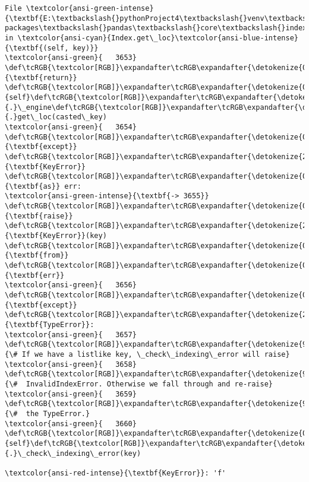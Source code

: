 \documentclass[11pt]{ctexart}
\begin{document}
\begin{Verbatim}[commandchars=\\\{\}, frame=single, framerule=2mm, rulecolor=\color{outerrorbackground}]
File \textcolor{ansi-green-intense}{\textbf{E:\textbackslash{}pythonProject4\textbackslash{}venv\textbackslash{}lib\textbackslash{}site-packages\textbackslash{}pandas\textbackslash{}core\textbackslash{}indexes\textbackslash{}base.py:3655}}, in \textcolor{ansi-cyan}{Index.get\_loc}\textcolor{ansi-blue-intense}{\textbf{(self, key)}}
\textcolor{ansi-green}{   3653}     \def\tcRGB{\textcolor[RGB]}\expandafter\tcRGB\expandafter{\detokenize{0,135,0}}{\textbf{return}} \def\tcRGB{\textcolor[RGB]}\expandafter\tcRGB\expandafter{\detokenize{0,135,0}}{self}\def\tcRGB{\textcolor[RGB]}\expandafter\tcRGB\expandafter{\detokenize{98,98,98}}{.}\_engine\def\tcRGB{\textcolor[RGB]}\expandafter\tcRGB\expandafter{\detokenize{98,98,98}}{.}get\_loc(casted\_key)
\textcolor{ansi-green}{   3654} \def\tcRGB{\textcolor[RGB]}\expandafter\tcRGB\expandafter{\detokenize{0,135,0}}{\textbf{except}} \def\tcRGB{\textcolor[RGB]}\expandafter\tcRGB\expandafter{\detokenize{215,95,95}}{\textbf{KeyError}} \def\tcRGB{\textcolor[RGB]}\expandafter\tcRGB\expandafter{\detokenize{0,135,0}}{\textbf{as}} err:
\textcolor{ansi-green-intense}{\textbf{-> 3655}}     \def\tcRGB{\textcolor[RGB]}\expandafter\tcRGB\expandafter{\detokenize{0,135,0}}{\textbf{raise}} \def\tcRGB{\textcolor[RGB]}\expandafter\tcRGB\expandafter{\detokenize{215,95,95}}{\textbf{KeyError}}(key) \def\tcRGB{\textcolor[RGB]}\expandafter\tcRGB\expandafter{\detokenize{0,135,0}}{\textbf{from}} \def\tcRGB{\textcolor[RGB]}\expandafter\tcRGB\expandafter{\detokenize{0,0,255}}{\textbf{err}}
\textcolor{ansi-green}{   3656} \def\tcRGB{\textcolor[RGB]}\expandafter\tcRGB\expandafter{\detokenize{0,135,0}}{\textbf{except}} \def\tcRGB{\textcolor[RGB]}\expandafter\tcRGB\expandafter{\detokenize{215,95,95}}{\textbf{TypeError}}:
\textcolor{ansi-green}{   3657}     \def\tcRGB{\textcolor[RGB]}\expandafter\tcRGB\expandafter{\detokenize{95,135,135}}{\# If we have a listlike key, \_check\_indexing\_error will raise}
\textcolor{ansi-green}{   3658}     \def\tcRGB{\textcolor[RGB]}\expandafter\tcRGB\expandafter{\detokenize{95,135,135}}{\#  InvalidIndexError. Otherwise we fall through and re-raise}
\textcolor{ansi-green}{   3659}     \def\tcRGB{\textcolor[RGB]}\expandafter\tcRGB\expandafter{\detokenize{95,135,135}}{\#  the TypeError.}
\textcolor{ansi-green}{   3660}     \def\tcRGB{\textcolor[RGB]}\expandafter\tcRGB\expandafter{\detokenize{0,135,0}}{self}\def\tcRGB{\textcolor[RGB]}\expandafter\tcRGB\expandafter{\detokenize{98,98,98}}{.}\_check\_indexing\_error(key)

\textcolor{ansi-red-intense}{\textbf{KeyError}}: 'f'
    \end{Verbatim}
\end{document}
